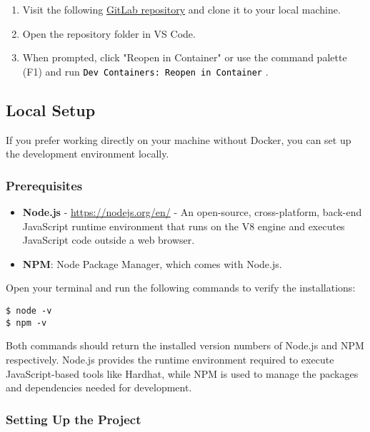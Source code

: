 \documentclass[12pt]{article}
\newcommand{\codegrey}[1]{%
  \texttt{\colorbox{black!4}{\textcolor{black}{#1}}}%
}
\begin{document}
\begin{enumerate}
  \item Visit the following \href{https://gitlab.fel.cvut.cz/radovluk/smart-contracts-exercises/-/tree/main/02-Decentralized-Voting-System/task/task-code?ref_type=heads}{GitLab repository} and clone it to your local machine.
  \item Open the repository folder in VS Code.
  \item When prompted, click "Reopen in Container" or use the command palette (F1) and run \codegrey{Dev Containers: Reopen in Container}.
\end{enumerate}

\subsection{Local Setup}

If you prefer working directly on your machine without Docker, you can set up the development environment locally.

\subsubsection*{Prerequisites}
\begin{itemize}
    \item \textbf{Node.js} - \url{https://nodejs.org/en/} - An open-source, cross-platform, back-end JavaScript runtime environment that runs on the V8 engine and executes JavaScript code outside a web browser.
    \item \textbf{NPM}: Node Package Manager, which comes with Node.js.
\end{itemize}

\noindent
Open your terminal and run the following commands to verify the installations:

\begin{verbatim}
$ node -v
$ npm -v
\end{verbatim}

Both commands should return the installed version numbers of Node.js and NPM respectively. Node.js provides the runtime environment required to execute JavaScript-based tools like Hardhat, while NPM is used to manage the packages and dependencies needed for development.

\subsubsection*{Setting Up the Project}
\end{document}
